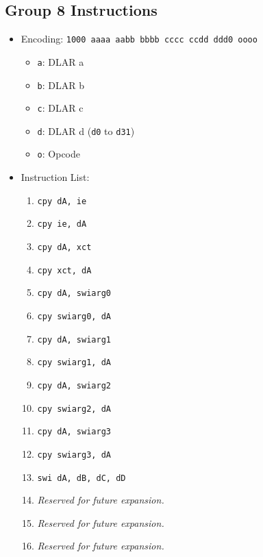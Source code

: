 \documentclass{article}
\begin{document}
	\subsection{Group 8 Instructions}
		\begin{itemize}
		\item Encoding:  \texttt{1000 aaaa aabb bbbb  cccc ccdd ddd0 oooo}
			\begin{itemize}
			\item \texttt{a}:  DLAR a
			\item \texttt{b}:  DLAR b
			\item \texttt{c}:  DLAR c
			\item \texttt{d}:  DLAR d (\texttt{d0} to \texttt{d31})
			\item \texttt{o}:  Opcode
			\end{itemize}

		\item Instruction List:
			\begin{enumerate}
			\item \texttt{cpy dA, ie}
			\item \texttt{cpy ie, dA}
			\item \texttt{cpy dA, xct}
			\item \texttt{cpy xct, dA}

			\item \texttt{cpy dA, swiarg0}
			\item \texttt{cpy swiarg0, dA}
			\item \texttt{cpy dA, swiarg1}
			\item \texttt{cpy swiarg1, dA}

			\item \texttt{cpy dA, swiarg2}
			\item \texttt{cpy swiarg2, dA}
			\item \texttt{cpy dA, swiarg3}
			\item \texttt{cpy swiarg3, dA}

			\item \texttt{swi dA, dB, dC, dD}
			\item \textit{Reserved for future expansion.}
			\item \textit{Reserved for future expansion.}
			\item \textit{Reserved for future expansion.}
			\end{enumerate}
		\end{itemize}
\end{document}
